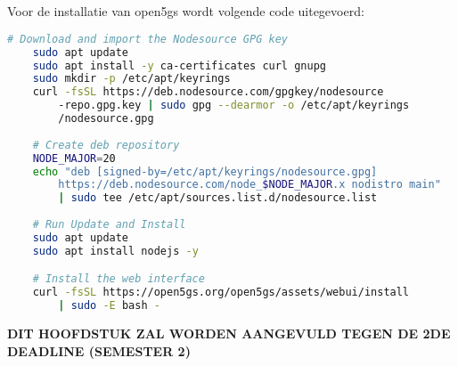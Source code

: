 \section{}

Voor de installatie van \gls{open5gs} wordt volgende code uitegevoerd:

\begin{lstlisting}[language=Bash, caption=Installatie van web-interface]
    # Download and import the Nodesource GPG key
    sudo apt update
    sudo apt install -y ca-certificates curl gnupg
    sudo mkdir -p /etc/apt/keyrings
    curl -fsSL https://deb.nodesource.com/gpgkey/nodesource
        -repo.gpg.key | sudo gpg --dearmor -o /etc/apt/keyrings
        /nodesource.gpg
    
    # Create deb repository
    NODE_MAJOR=20
    echo "deb [signed-by=/etc/apt/keyrings/nodesource.gpg] 
        https://deb.nodesource.com/node_$NODE_MAJOR.x nodistro main" 
        | sudo tee /etc/apt/sources.list.d/nodesource.list
    
    # Run Update and Install
    sudo apt update
    sudo apt install nodejs -y

    # Install the web interface
    curl -fsSL https://open5gs.org/open5gs/assets/webui/install 
        | sudo -E bash -
\end{lstlisting}

\textbf{DIT HOOFDSTUK ZAL WORDEN AANGEVULD TEGEN DE 2DE DEADLINE (SEMESTER 2)}

\section{}

\subsection{}

\subsection{}

\section{}
